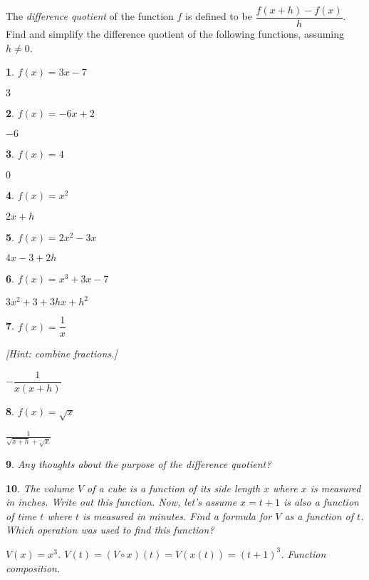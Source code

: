 \documentclass{amsbook}
\newtheorem{exc}{}
\newenvironment{ex}{\begin{exc}\normalfont}{\end{exc}}
\numberwithin{section}{chapter}
\numberwithin{equation}{chapter}
\begin{document}
The \textit{difference quotient} of the function $f$ is defined to be $\dfrac{f(x+h) - f(x)}{h}$. Find and simplify the difference quotient of the following functions, assuming $h\neq0$.
\begin{multicols}{2}
\begin{ex} \label{diffquotquest}
	$f(x) = 3x-7$
	\begin{sol}
		$3$
	\end{sol}
\end{ex}
\begin{ex}
	$f(x) = -6x+2$
	\begin{sol}
		$-6$
	\end{sol}
\end{ex}
\begin{ex}
	$f(x) = 4$
	\begin{sol}
		$0$
	\end{sol}
\end{ex}
\begin{ex}
	$f(x) = x^2$
	\begin{sol}
		$2x+h$
	\end{sol}
\end{ex}
\begin{ex}
	$f(x) = 2x^2-3x$
	\begin{sol}
		$4x-3+2h$
	\end{sol}
\end{ex}
\begin{ex}
	$f(x) = x^3+3x-7$
	\begin{sol}
		$3x^2+3 + 3hx+h^2$
	\end{sol}
\end{ex}
\begin{ex}
	$f(x) = \dfrac{1}{x}$
	
	[Hint: combine fractions.]
	\begin{sol}
		$-\dfrac{1}{x(x+h)}$
	\end{sol}
\end{ex}
\begin{ex}
	$f(x) = \sqrt{x}$
	\begin{sol}
		$\frac{1}{\sqrt{x+h}+\sqrt{x}}$
	\end{sol}
\end{ex}
\end{multicols}

\begin{ex}
	Any thoughts about the purpose of the difference quotient?
\end{ex}

\begin{ex}
	The volume $V$ of a cube is a function of its side length $x$ where $x$ is measured in inches. Write out this function. Now, let's assume $x=t+1$ is also a function of time $t$ where $t$ is measured in minutes. Find a formula for $V$ as a function of $t$. Which operation was used to find this function?
	\begin{sol}
		$V(x) =x^3$. $V(t) = (V\circ x)(t) = V(x(t)) = (t+1)^3$. Function composition.
	\end{sol}
\end{ex}
\end{document}
